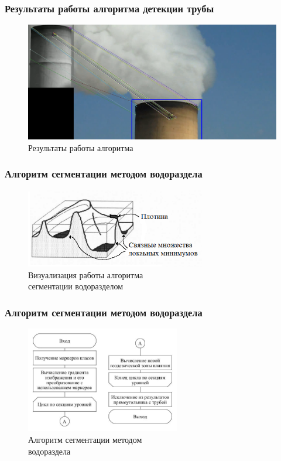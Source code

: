\documentclass[t]{beamer}
\begin{document}
	
	\begin{frame}
		\frametitle{Результаты работы алгоритма детекции трубы}
		\vspace*{0.6cm}
		\begin{figure}[h!]
			\centering
			\includegraphics[width = \textwidth]{image/match1}
			\caption{Результаты работы алгоритма}
			\label{fig:fullprepare}
		\end{figure}
	\end{frame}	

\begin{frame}
	\frametitle{Алгоритм сегментации методом водораздела}
	\vspace*{0.7cm}
	\begin{figure}[h!]
		\centering
		\includegraphics[width = 0.7\textwidth]{image/potop1_watershed}
		\caption{Визуализация работы алгоритма\\ сегментации водоразделом}
		\label{fig:potop1_watershed}	
	\end{figure}
\end{frame}

	\begin{frame}
		\frametitle{Алгоритм сегментации методом водораздела}
		\vspace*{0.7cm}
		\begin{figure}[h!]
			\centering
			\includegraphics[width = 0.6\textwidth]{image/waterShedSegmentation}
			\caption{Алгоритм сегментации методом\\ водораздела}
			\label{fig:fullprepare}	
		\end{figure}
	\end{frame}
\end{document}
